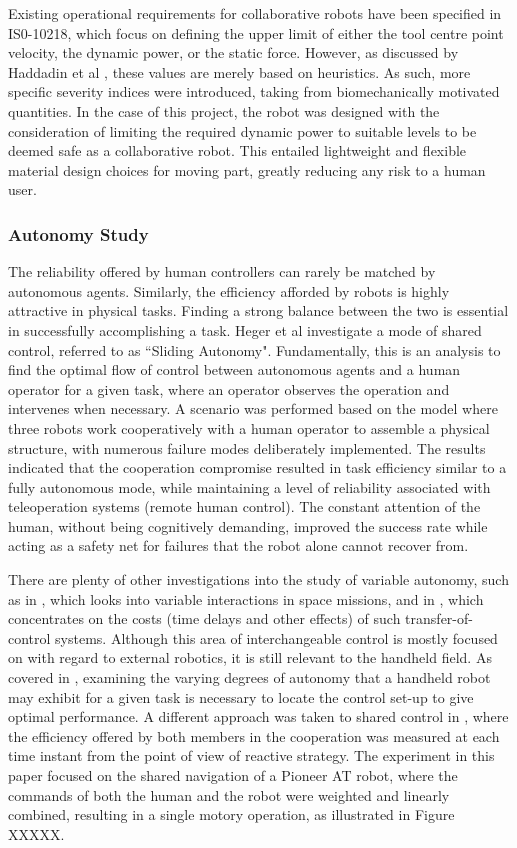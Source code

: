 \documentclass[11pt]{article}
\begin{document}
Existing operational requirements for collaborative robots have been specified in IS0-10218, which focus on defining the upper limit of either the tool centre point velocity, the dynamic power, or the static force. However, as discussed by Haddadin et al \cite{Haddadin2007}, these values are merely based on heuristics. As such, more specific severity indices were introduced, taking from biomechanically motivated quantities. In the case of this project, the robot was designed with the consideration of limiting the required dynamic power to suitable levels to be deemed safe as a collaborative robot. This entailed lightweight and flexible material design choices for moving part, greatly reducing any risk to a human user.

\subsubsection{Autonomy Study}
The reliability offered by human controllers can rarely be matched by autonomous agents. Similarly, the efficiency afforded by robots is highly attractive in physical tasks. Finding a strong balance between the two is essential in successfully accomplishing a task. Heger et al \cite{heger2006} investigate a mode of shared control, referred to as ``Sliding Autonomy". Fundamentally, this is an analysis to find the optimal flow of control between autonomous agents and a human operator for a given task, where an operator observes the operation and intervenes when necessary. A scenario was performed based on the model where three robots work cooperatively with a human operator to assemble a physical structure, with numerous failure modes deliberately implemented. The results indicated that the cooperation compromise resulted in task efficiency similar to a fully autonomous mode, while maintaining a level of reliability associated with teleoperation systems (remote human control). The constant attention of the human, without being cognitively demanding, improved the success rate while acting as a safety net for failures that the robot alone cannot recover from.

There are plenty of other investigations into the study of variable autonomy, such as in \cite{Dorais1999}, which looks into variable interactions in space missions, and in \cite{tambe2002}, which concentrates on the costs (time delays and other effects) of such transfer-of-control systems. Although this area of interchangeable control is mostly focused on with regard to external robotics, it is still relevant to the handheld field. As covered in \cite{GreggSmithDesign}, examining the varying degrees of autonomy that a handheld robot may exhibit for a given task is necessary to locate the control set-up to give optimal performance.
A different approach was taken to shared control in \cite{Poncela2009}, where the efficiency offered by both members in the cooperation was measured at each time instant from the point of view of reactive strategy. The experiment in this paper focused on the shared navigation of a Pioneer AT robot, where the commands of both the human and the robot were weighted and linearly combined, resulting in a single motory operation, as illustrated in Figure XXXXX.
\end{document}
